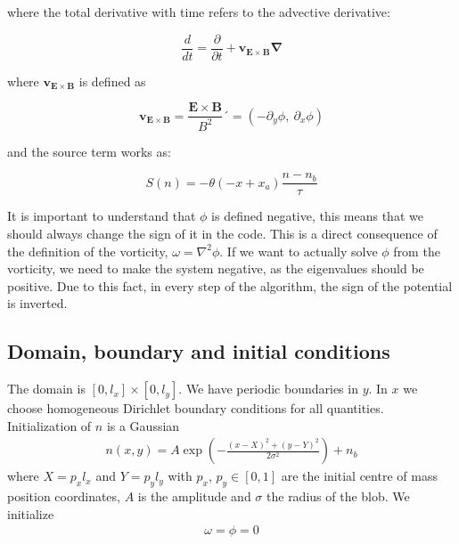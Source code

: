 \documentclass{hitec} %
\begin{document}
where the total derivative with time refers to the advective derivative:

\begin{equation}
\frac{d}{dt} = \frac{\partial}{\partial t} + \boldsymbol{v_{E\times B} \nabla}
\end{equation}

where $\boldsymbol{v_{E\times B}}$ is defined as

\begin{equation}
\boldsymbol{v_{E\times B}} = \frac{\boldsymbol{E\times B}}{ B^2}´ = (-\partial_y\phi,~\partial_x\phi)
\end{equation}

and the source term works as:

\begin{equation}
S(n) = -\theta(- x + x_a)\frac{n - n_b}{\tau}
\end{equation}

It is important to understand that $\phi$ is defined negative, this means that we should always change the sign of it in the code. This is a direct consequence of the definition of the vorticity, $\omega = \nabla^2\phi$. If we want to actually solve $\phi$ from the vorticity, we need to make the system negative, as the eigenvalues should be positive. Due to this fact, in every step of the algorithm, the sign of the potential is inverted.


%



\subsection{Domain, boundary and initial conditions}
The domain is $[0,l_x]\times[0,l_y]$.
We have periodic boundaries in $y$. In $x$ we choose homogeneous Dirichlet boundary conditions for all quantities.
Initialization of $n$ is a Gaussian
\begin{align}
    n(x,y) = A\exp\left( -\frac{(x-X)^2 + (y-Y)^2}{2\sigma^2}\right) + n_b
    \label{}
\end{align}
where $X = p_x l_x$ and $Y=p_yl_y$ with $p_x$, $p_y\in [0,1]$ are the initial centre of mass position coordinates, $A$ is the amplitude and $\sigma$ the
radius of the blob.
We initialize
\begin{align}
    \omega = \phi = 0
    \label{}
\end{align}
\end{document}
